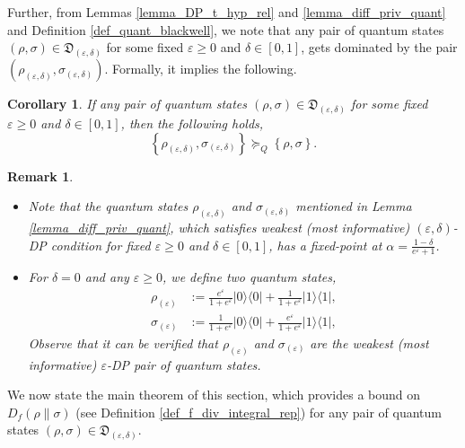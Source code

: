 \documentclass[onecolumn,ldraftcls, 11pt]{IEEEtran}
\newcommand{\ketbra}[1]{|#1\rangle\langle#1|}
\newcommand{\eps}{\varepsilon}
\newtheorem{remark}{Remark}
\newtheorem{corollary}{Corollary}
\begin{document}
 Further, from Lemmas \ref{lemma_DP_t_hyp_rel} and \ref{lemma_diff_priv_quant} and Definition \ref{def_quant_blackwell}, we note that any pair of quantum states $(\rho,\sigma) \in \mathfrak{D}_{(\eps,\delta)}$ for some fixed $\eps \geq 0$ and $\delta \in [0,1]$, gets dominated by the pair $(\rho_{(\eps,\delta)},\sigma_{(\eps,\delta)})$. Formally, it implies the following. 


\begin{corollary}\label{corr_QLDP_blackwell}
    If any pair of quantum states $(\rho,\sigma) \in \mathfrak{D}_{(\eps,\delta)}$ for some fixed $\eps \geq 0$ and $\delta \in [0,1]$, then the following holds,
    \begin{equation}
       \left\{\rho_{(\eps,\delta)},\sigma_{(\eps,\delta)}\right\} \succeq_{Q}  \left\{\rho,\sigma\right\} .\label{corr_QLDP_blackwell_eq}
    \end{equation}
\end{corollary}

\begin{remark}\hfill
   \begin{itemize}
    \item Note that the quantum states $\rho_{(\eps,\delta)}$ and $\sigma_{(\eps,\delta)}$ mentioned in Lemma \ref{lemma_diff_priv_quant}, which satisfies weakest (most informative) $(\eps,\delta)$-DP condition for fixed $\eps \geq 0$ and $\delta \in [0,1]$, has a fixed-point at $\alpha = \frac{1-\delta}{e^\eps+1}$. 
    \item For $\delta = 0$ and any $\eps \geq 0$, we define two quantum states, 
    \begin{align}
        \rho_{(\eps)} &:= \frac{e^\eps}{1+e^\eps}\ketbra{0} + \frac{1}{1+e^\eps}\ketbra{1},\label{rho_pure_weak}\\
        \sigma_{(\eps)} &:= \frac{1}{1+e^\eps}\ketbra{0} + \frac{e^\eps}{1+e^\eps}\ketbra{1},\label{sigma_pure_weak}
    \end{align}
     Observe that it can be verified that $\rho_{(\eps)}$ and $\sigma_{(\eps)}$ are the weakest (most informative) $\eps$-DP pair of quantum states.
   \end{itemize}
\end{remark}

We now state the main theorem of this section, which provides a bound on $D_f(\rho\|\sigma)$ (see Definition \ref{def_f_div_integral_rep}) for any pair of quantum states $(\rho,\sigma) \in \mathfrak{D}_{(\eps,\delta)}$.
\end{document}
